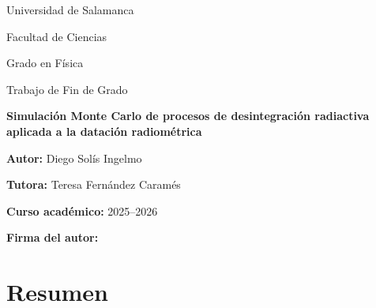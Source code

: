 \documentclass[12pt,a4paper]{article}
\newcommand{\tituloTFG}{Simulación Monte Carlo de procesos de desintegración radiactiva aplicada a la datación radiométrica}
\newcommand{\autorTFG}{Diego Solís Ingelmo}
\newcommand{\tutorTFG}{Teresa Fernández Caramés}
\newcommand{\gradoTFG}{Grado en Física}
\newcommand{\universidadTFG}{Universidad de Salamanca}
\newcommand{\facultadTFG}{Facultad de Ciencias}
\newcommand{\cursoTFG}{2025--2026}
\begin{document}
\begin{titlepage}
    \thispagestyle{empty}
    \centering

    {\Large \universidadTFG \par}
    \vspace{0.3cm}

    {\large \facultadTFG \par}
    \vspace{0.3cm}

    {\large \gradoTFG \par}

    \vspace{2.5cm}

    {\Large Trabajo de Fin de Grado \par}

    \vspace{1.5cm}

    {\Huge \bfseries \tituloTFG \par}

    \vfill

    {\large
        \textbf{Autor:} \autorTFG \par
        \vspace{0.3cm}

        \textbf{Tutora:} \tutorTFG \par
        \vspace{0.3cm}

        \textbf{Curso académico:} \cursoTFG \par
    }

    \vspace{1.2cm}

    {\large
        \textbf{Firma del autor:}\par
    }

    \vspace{2cm}

\end{titlepage}


\newpage
\section*{Resumen}
\end{document}
